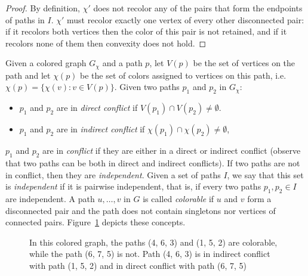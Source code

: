 \begin{proof}
By definition,
$\chi'$ does not recolor any of the pairs that form the endpoints of paths in $I$.
%
$\chi'$ must recolor exactly one vertex of every other disconnected pair:
if it recolors both vertices then the color of this pair is not retained,
and if it recolors none of them then convexity does not hold.
\end{proof}

Given a colored graph $G_\chi$ and a path $p$, 
let $V(p)$ be the set of vertices on the path and let $\chi(p)$ 
be the set of colors assigned to vertices on this path, 
i.e. $\chi(p) = {\{\chi(v) : v \in V(p)\}}$.
%
Given two paths $p_1$ and $p_2$ in $G_\chi$:
\begin{itemize}
\item 
$p_1$ and $p_2$ are in \emph{direct conflict} if $V(p_1) \cap V(p_2) \neq \emptyset$.

\item 
$p_1$ and $p_2$ are in \emph{indirect conflict} if $\chi(p_1) \cap \chi(p_2) \neq \emptyset$,
\end{itemize}
%
$p_1$ and $p_2$ are in \emph{conflict} if they are either in a direct
or indirect conflict (observe that two paths can be both in direct and
indirect conflicts).
%
If two paths are not in conflict, 
then they are \emph{independent}.
%
Given a set of paths $I$, 
we say that this set is \emph{independent}
if it is pairwise independent, 
that is, 
if every two paths $p_1, p_2 \in I$ are independent.
%
A path $u, \dots, v$ in $G$ is called \emph{colorable} if $u$ and $v$
form a disconnected pair and the path does not contain singletons nor
vertices of connected pairs.
%
Figure~\ref{fig:paths} depicts these concepts.

\begin{figure}[t]
\centering


\caption{
\label{fig:paths}
In this colored graph, the paths (4, 6, 3) and (1, 5, 2) are colorable, while
the path (6, 7, 5) is not.
Path (4, 6, 3) is in indirect conflict with path (1, 5, 2) and in direct
conflict with path (6, 7, 5)
}
\end{figure}

